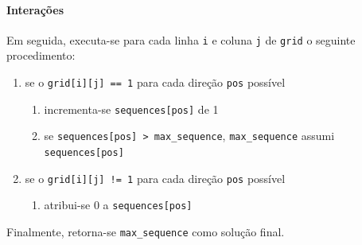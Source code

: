 \documentclass[a4paper]{article}
\begin{document}
\paragraph{Interações} Em seguida, executa-se para cada linha \texttt{i} e coluna \texttt{j} de \texttt{grid} o seguinte procedimento:
\begin{enumerate}
    \item se o \texttt{grid[i][j] == 1} para cada direção \texttt{pos} possível
    \begin{enumerate}
        \item incrementa-se \texttt{sequences[pos]} de 1
        \item se \texttt{sequences[pos] > max\_sequence}, \texttt{max\_sequence} assumi \texttt{sequences[pos]}
    \end{enumerate}
    \item se o \texttt{grid[i][j] != 1} para cada direção \texttt{pos} possível
    \begin{enumerate}
        \item atribui-se 0 a \texttt{sequences[pos]}
    \end{enumerate}
\end{enumerate}
Finalmente, retorna-se \texttt{max\_sequence} como solução final.
\end{document}
